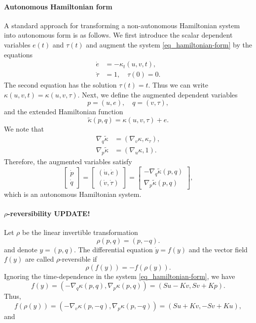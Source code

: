 \documentclass[11pt]{article}
\begin{document}
\paragraph{Autonomous Hamiltonian form}
A standard approach for transforming a non-autonomous Hamiltonian system into autonomous form is as
follows. We first introduce the scalar dependent variables $e(t)$ and $\tau(t)$ and augment the
system \eqref{eq_hamiltonian-form} by the equations
\begin{align*}
  \dot{e} &= -\kappa_t(u,v,t),\\
  \dot{\tau} &= 1,\quad \tau(0)=0.
\end{align*}
The second equation has the solution $\tau(t) = t$. Thus we can write
$\kappa(u,v,t) = \kappa(u,v,\tau)$.
Next, we define the augmented dependent variables
\[
p = (u, e),\quad q=(v, \tau),
\]
and the extended Hamiltonian function
\[
\tilde{\kappa}(p,q) = \kappa(u,v,\tau) + e.
\]
We note that
\begin{align*}
  \nabla_{q} \tilde{\kappa} &= (\nabla_v \kappa, \kappa_\tau),\\
  \nabla_{p} \tilde{\kappa} &= (\nabla_u \kappa, 1).
\end{align*}
Therefore, the augmented variables satisfy
\[
\begin{bmatrix}
  \dot{p} \\
  \dot{q}
\end{bmatrix} =
%
\begin{bmatrix}
  (\dot{u}, \dot{e}) \\
  (\dot{v}, \dot{\tau})
\end{bmatrix} =
%
\begin{bmatrix}
  -\nabla_{q} \tilde{\kappa}(p, q)\\
  \nabla_{p} \tilde{\kappa}(p, q)
\end{bmatrix},
\]
which is an autonomous Hamiltonian system.  

\paragraph{$\rho$-reversibility UPDATE!}
Let $\rho$ be the linear invertible transformation
\[
\rho(p,q) = (p, -q).
\]
and denote $y=(p,q)$. The differential equation $\dot{y}=f(y)$ and the vector field $f(y)$ are
called $\rho$-reversible if
\[
\rho(f(y)) = -f(\rho(y)).
\]
Ignoring the time-dependence in the system \eqref{eq_hamiltonian-form}, we have
\[
f(y) =   \left( -\nabla_q \kappa(p,q), \nabla_p \kappa(p,q) \right) = ( S u - Kv, S v + K p ).
\]
Thus,
\[
f(\rho(y)) = \left( -\nabla_v \kappa(p,-q), \nabla_p \kappa(p,-q) \right) = ( S u + Kv, -S v + K u ),
\]
and
\end{document}
